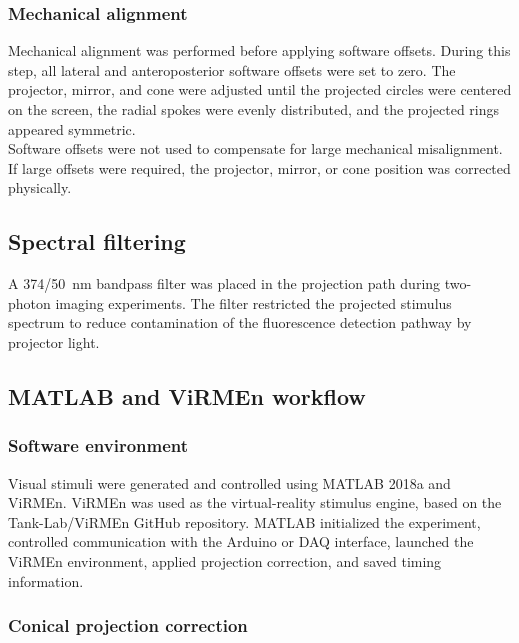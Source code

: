 \subsubsection{Mechanical alignment}

Mechanical alignment was performed before applying software offsets. During this step, all lateral and anteroposterior software offsets were set to zero. The projector, mirror, and cone were adjusted until the projected circles were centered on the screen, the radial spokes were evenly distributed, and the projected rings appeared symmetric.\\

Software offsets were not used to compensate for large mechanical misalignment. If large offsets were required, the projector, mirror, or cone position was corrected physically.\\

\subsection{Spectral filtering}

A 374/50~nm bandpass filter was placed in the projection path during two-photon imaging experiments. The filter restricted the projected stimulus spectrum to reduce contamination of the fluorescence detection pathway by projector light.\\

\subsection{MATLAB and ViRMEn workflow}

\subsubsection{Software environment}

Visual stimuli were generated and controlled using MATLAB 2018a and ViRMEn. ViRMEn was used as the virtual-reality stimulus engine, based on the Tank-Lab/ViRMEn GitHub repository. MATLAB initialized the experiment, controlled communication with the Arduino or DAQ interface, launched the ViRMEn environment, applied projection correction, and saved timing information.\\

\subsubsection{Conical projection correction}

